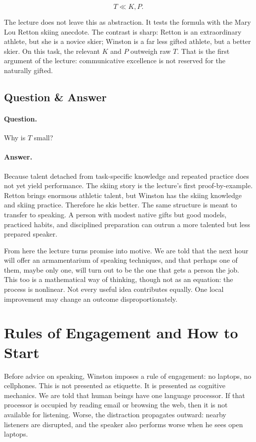\begin{equation}
T \ll K,P.
\end{equation}

The lecture does not leave this as abstraction. It tests the formula with the Mary Lou Retton skiing anecdote. The contrast is sharp: Retton is an extraordinary athlete, but she is a novice skier; Winston is a far less gifted athlete, but a better skier. On this task, the relevant \(K\) and \(P\) outweigh raw \(T\). That is the first argument of the lecture: communicative excellence is not reserved for the naturally gifted.

\subsection{Question \& Answer}

\paragraph{Question.} Why is \(T\) small?

\paragraph{Answer.} Because talent detached from task-specific knowledge and repeated practice does not yet yield performance. The skiing story is the lecture's first proof-by-example. Retton brings enormous athletic talent, but Winston has the skiing knowledge and skiing practice. Therefore he skis better. The same structure is meant to transfer to speaking. A person with modest native gifts but good models, practiced habits, and disciplined preparation can outrun a more talented but less prepared speaker.

From here the lecture turns promise into motive. We are told that the next hour will offer an armamentarium of speaking techniques, and that perhaps one of them, maybe only one, will turn out to be the one that gets a person the job. This too is a mathematical way of thinking, though not as an equation: the process is nonlinear. Not every useful idea contributes equally. One local improvement may change an outcome disproportionately.

\section{Rules of Engagement and How to Start}

Before advice on speaking, Winston imposes a rule of engagement: no laptops, no cellphones. This is not presented as etiquette. It is presented as cognitive mechanics. We are told that human beings have one language processor. If that processor is occupied by reading email or browsing the web, then it is not available for listening. Worse, the distraction propagates outward: nearby listeners are disrupted, and the speaker also performs worse when he sees open laptops.

